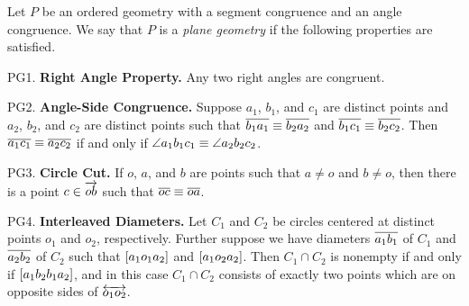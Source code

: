\begin{dfn}
Let \(P\) be an ordered geometry with a segment congruence and an angle congruence.
We say that \(P\) is a \emph{plane geometry} if the following properties are satisfied.
\begin{proplist}
\item[PG1.] \textbf{Right Angle Property.} Any two right angles are congruent.

\item[PG2.] \textbf{Angle-Side Congruence.} Suppose \(a_1\), \(b_1\), and \(c_1\) are distinct points and \(a_2\), \(b_2\), and \(c_2\) are distinct points such that \(\overline{b_1a_1} \equiv \overline{b_2a_2}\) and \(\overline{b_1c_1} \equiv \overline{b_2c_2}\).
Then \(\overline{a_1c_1} \equiv \overline{a_2c_2}\) if and only if \(\angle{a_1b_1c_1} \equiv \angle{a_2b_2c_2}\).

\item[PG3.] \textbf{Circle Cut.} If \(o\), \(a\), and \(b\) are points such that \(a \neq o\) and \(b \neq o\), then there is a point \(c \in \overrightarrow{ob}\) such that \(\overline{oc} \equiv \overline{oa}\).

\begin{center}
\end{center}

\item[PG4.] \textbf{Interleaved Diameters.} Let \(C_1\) and \(C_2\) be circles centered at distinct points \(o_1\) and \(o_2\), respectively.
Further suppose we have diameters \(\overline{a_1b_1}\) of \(C_1\) and \(\overline{a_2b_2}\) of \(C_2\) such that \([ a_1 o_1 a_2 ]\) and \([ a_1 o_2 a_2 ]\).
Then \(C_1 \cap C_2\) is nonempty if and only if \([ a_1b_2b_1a_2 ]\), and in this case \(C_1 \cap C_2\) consists of exactly two points which are on opposite sides of \(\overleftrightarrow{o_1o_2}\).


\end{proplist}
\end{dfn}
